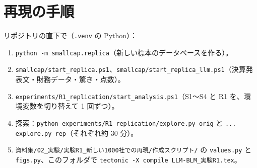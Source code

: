 \documentclass[xelatex,ja=standard,jafont=haranoaji,a4paper,10pt,openany]{bxjsreport}
\newcommand{\code}[1]{\texttt{#1}}
\begin{document}
\chapter*{再現の手順}

リポジトリの直下で（\code{.venv} の Python）：

\begin{enumerate}
\item \code{python -m smallcap.replica}（新しい標本のデータベースを作る）。
\item \code{smallcap/start\_replica.ps1}、\code{smallcap/start\_replica\_llm.ps1}（決算発表文・財務データ・驚き・点数）。
\item \code{experiments/R1\_replication/start\_analysis.ps1}（S1〜S4 と R1 を、環境変数を切り替えて 1 回ずつ）。
\item 探索：\code{python experiments/R1\_replication/explore.py orig} と \code{... explore.py rep}（それぞれ約 30 分）。
\item \code{資料集/02\_実験/実験R1\_新しい1000社での再現/作成スクリプト/} の \code{values.py} と \code{figs.py}、このフォルダで \code{tectonic -X compile LLM-BLM\_実験R1.tex}。
\end{enumerate}
\end{document}

